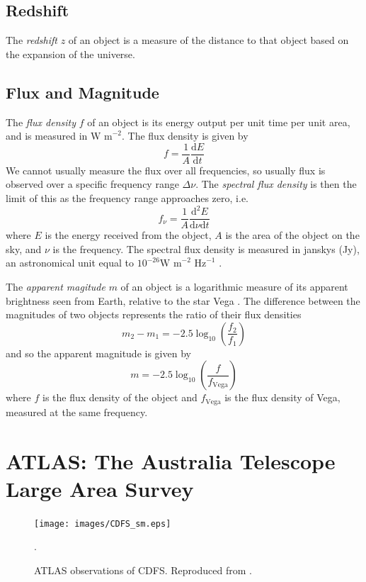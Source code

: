         \subsection{Redshift}

            The \emph{redshift} $z$ of an object is a measure of the distance to that object based on the expansion of the universe. 

        \subsection{Flux and Magnitude}

            The \emph{flux density} $f$ of an object is its energy output per unit time per unit area, and is measured in $\text{W m}^{-2}$. The flux density is given by
            \[
                f = \frac{1}{A}\frac{\text{d}E}{\text{d}t}
            \]
            We cannot usually measure the flux over all frequencies, so usually flux is observed over a specific frequency range $\Delta \nu$. The \emph{spectral flux density} is then the limit of this as the frequency range approaches zero, i.e.
            \[
                f_\nu = \frac{1}{A}\frac{\text{d}^2E}{\text{d}\nu\text{d}t}
            \]
            where $E$ is the energy received from the object, $A$ is the area of the object on the sky, and $\nu$ is the frequency. The spectral flux density is measured in janskys (Jy), an astronomical unit equal to $10^{-26} \text{W m}^{-2} \text{ Hz}^{-1}$ \citep{francis08}.

            The \emph{apparent magitude} $m$ of an object is a logarithmic measure of its apparent brightness seen from Earth, relative to the star Vega \citep{francis08}. The difference between the magnitudes of two objects represents the ratio of their flux densities
            \[
                m_2 - m_1 = -2.5 \log_{10} \left(\frac{f_2}{f_1}\right)
            \]
            and so the apparent magnitude is given by
            \[
                m = -2.5 \log_{10} \left(\frac{f}{f_{\text{Vega}}}\right)
            \]
            where $f$ is the flux density of the object and $f_{\text{Vega}}$ is the flux density of Vega, measured at the same frequency.

    \section{ATLAS: The Australia Telescope Large Area Survey}

        \begin{figure}[!ht]
          \texttt{[image: images/CDFS\_sm.eps]}
          \caption{ATLAS observations of CDFS. Reproduced from \citet{franzen15}.}.
          \label{fig:cdfs}
        \end{figure}

